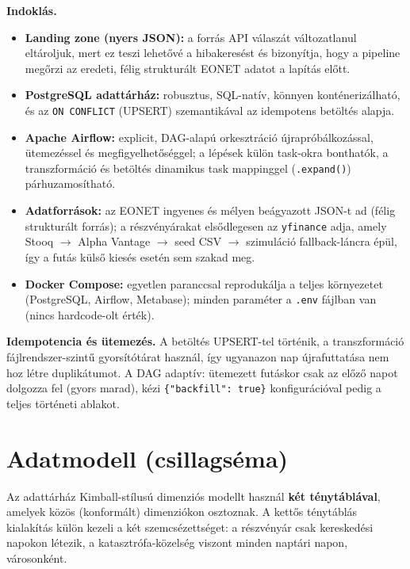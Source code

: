 \documentclass[11pt,a4paper]{article}
\begin{document}
\textbf{Indoklás.}
\begin{itemize}[leftmargin=1.4em,itemsep=0.1em]
  \item \textbf{Landing zone (nyers JSON):} a forrás API válaszát változatlanul
        eltároljuk, mert ez teszi lehetővé a hibakeresést és bizonyítja, hogy a
        pipeline megőrzi az eredeti, félig strukturált EONET adatot a lapítás előtt.
  \item \textbf{PostgreSQL adattárház:} robusztus, SQL-natív, könnyen
        konténerizálható, és az \texttt{ON CONFLICT} (UPSERT) szemantikával az
        idempotens betöltés alapja.
  \item \textbf{Apache Airflow:} explicit, DAG-alapú orkesztráció
        újrapróbálkozással, ütemezéssel és megfigyelhetőséggel; a lépések külön
        task-okra bonthatók, a transzformáció és betöltés dinamikus task
        mappinggel (\texttt{.expand()}) párhuzamosítható.
  \item \textbf{Adatforrások:} az EONET ingyenes és mélyen beágyazott JSON-t ad
        (félig strukturált forrás); a részvényárakat elsődlegesen az
        \texttt{yfinance} adja, amely Stooq $\rightarrow$ Alpha Vantage
        $\rightarrow$ seed CSV $\rightarrow$ szimuláció fallback-láncra épül, így
        a futás külső kiesés esetén sem szakad meg.
  \item \textbf{Docker Compose:} egyetlen paranccsal reprodukálja a teljes
        környezetet (PostgreSQL, Airflow, Metabase); minden paraméter a
        \texttt{.env} fájlban van (nincs hardcode-olt érték).
\end{itemize}

\textbf{Idempotencia és ütemezés.} A betöltés UPSERT-tel történik, a
transzformáció fájlrendszer-szintű gyorsítótárat használ, így ugyanazon nap
újrafuttatása nem hoz létre duplikátumot. A DAG adaptív: ütemezett futáskor
csak az előző napot dolgozza fel (gyors marad), kézi
\texttt{\{"backfill": true\}} konfigurációval pedig a teljes történeti ablakot.

\section{Adatmodell (csillagséma)}

Az adattárház Kimball-stílusú dimenziós modellt használ \textbf{két ténytáblával},
amelyek közös (konformált) dimenziókon osztoznak. A kettős ténytáblás kialakítás
külön kezeli a két szemcsézettséget: a részvényár csak kereskedési napokon
létezik, a katasztrófa-közelség viszont minden naptári napon, városonként.
\end{document}
